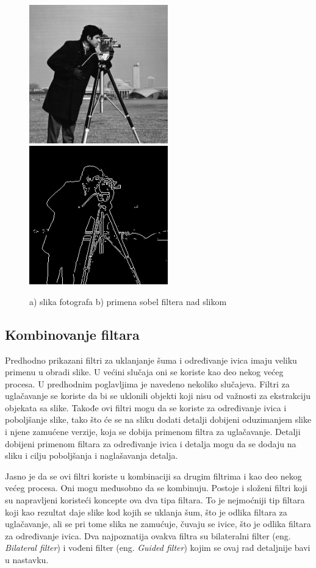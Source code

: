 \documentclass[a4paper,12pt,titlepage]{article}
\begin{document}
\begin{figure}[ht!]
\centering
\includegraphics[width=60mm]{img/img.png}
\includegraphics[width=60mm]{img/imgSob.png}
\caption{a) slika fotografa b) primena sobel filtera nad slikom}
\label{sobel}
\end{figure}

\subsection{Kombinovanje filtara}%

Predhodno prikazani filtri za uklanjanje šuma i određivanje ivica imaju veliku primenu u obradi slike. U većini slučaja oni se koriste kao deo nekog većeg procesa. U predhodnim poglavljima je navedeno nekoliko slučajeva. Filtri za uglačavanje se koriste da bi se uklonili objekti koji nisu od važnosti za ekstrakciju objekata sa slike. Takođe ovi filtri mogu da se koriste za određivanje ivica i poboljšanje slike, tako što će se na sliku dodati detalji dobijeni oduzimanjem slike i njene zamućene verzije, koja se dobija primenom filtra za uglačavanje. Detalji dobijeni primenom filtara za određivanje ivica i detalja mogu da se dodaju na sliku i cilju poboljšanja i naglašavanja detalja. 

Jasno je da se ovi filtri koriste u kombinaciji sa drugim filtrima i kao deo nekog većeg procesa. Oni mogu međusobno da se kombinuju. Postoje i složeni filtri koji su napravljeni koristeći koncepte ova dva tipa filtara. To je nejmoćniji tip filtara koji kao rezultat daje slike kod kojih se uklanja šum, što je odlika filtara za uglačavanje, ali se pri tome slika ne zamućuje, čuvaju se ivice, što je odlika filtara za određivanje ivica. Dva najpoznatija ovakva filtra su bilateralni filter (eng. \emph{Bilateral filter}) i vođeni filter (eng. \emph{Guided filter}) kojim se ovaj rad detaljnije bavi u nastavku. 
\end{document}
